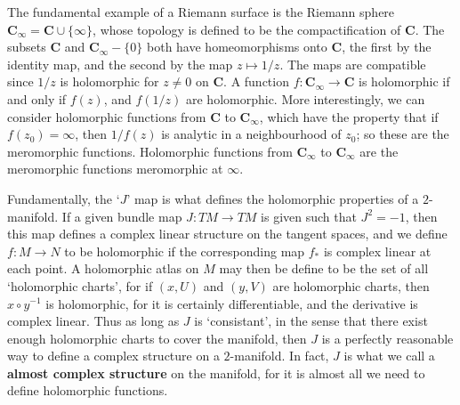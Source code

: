 \begin{example}
    The fundamental example of a Riemann surface is the Riemann sphere $\mathbf{C}_\infty = \mathbf{C} \cup \{ \infty \}$, whose topology is defined to be the compactification of $\mathbf{C}$. The subsets $\mathbf{C}$ and $\mathbf{C}_\infty - \{ 0 \}$ both have homeomorphisms onto $\mathbf{C}$, the first by the identity map, and the second by the map $z \mapsto 1/z$. The maps are compatible since $1/z$ is holomorphic for $z \neq 0$ on $\mathbf{C}$. A function $f: \mathbf{C}_\infty \to \mathbf{C}$ is holomorphic if and only if $f(z)$, and $f(1/z)$ are holomorphic. More interestingly, we can consider holomorphic functions from $\mathbf{C}$ to $\mathbf{C}_\infty$, which have the property that if $f(z_0) = \infty$, then $1/f(z)$ is analytic in a neighbourhood of $z_0$; so these are the meromorphic functions. Holomorphic functions from $\mathbf{C}_\infty$ to $\mathbf{C}_\infty$ are the meromorphic functions meromorphic at $\infty$.
\end{example}

Fundamentally, the `$J$' map is what defines the holomorphic properties of a $2$-manifold. If a given bundle map $J:TM \to TM$ is given such that $J^2 = -1$, then this map defines a complex linear structure on the tangent spaces, and we define $f: M \to N$ to be holomorphic if the corresponding map $f_*$ is complex linear at each point. A holomorphic atlas on $M$ may then be define to be the set of all `holomorphic charts', for if $(x,U)$ and $(y,V)$ are holomorphic charts, then $x \circ y^{-1}$ is holomorphic, for it is certainly differentiable, and the derivative is complex linear. Thus as long as $J$ is `consistant', in the sense that there exist enough holomorphic charts to cover the manifold, then $J$ is a perfectly reasonable way to define a complex structure on a $2$-manifold. In fact, $J$ is what we call a {\bf almost complex structure} on the manifold, for it is almost all we need to define holomorphic functions.

